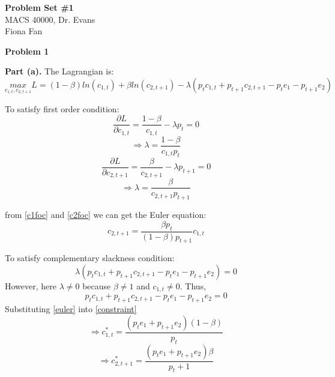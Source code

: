 \documentclass[letterpaper,12pt]{article}
\theoremstyle{definition}
\begin{document}
\begin{flushleft}
  \textbf{\large{Problem Set \#1}} \\
  MACS 40000, Dr. Evans \\
  Fiona Fan 
\end{flushleft}

\vspace{5mm}

\noindent\textbf{Problem 1}

\textbf{Part (a).} The Lagrangian is:
\begin{equation*}
	\underset{c_{1,t}, c_{2,t+1}}{max}
  L= (1-\beta)ln(c_{1,t})+\beta ln(c_{2,t+1})-\lambda (p_t c_{1,t}+p_{t+1} c_{2,t+1}-p_t e_1-p_{t+1} e_2)
\end{equation*}

To satisfy first order condition:
\begin{equation*} 
\frac{\partial L}{\partial c_{1,t}} = \frac{1-\beta}{c_{1,t}}-\lambda p_t = 0
\end{equation*}
\begin{equation} \label{c1foc}
\Rightarrow \lambda = \frac{1-\beta}{c_{1,t}  p_t}
\end{equation}
\begin{equation*} 
\frac{\partial L}{\partial c_{2,t+1}} = \frac{\beta}{c_{2,t+1}}-\lambda p_{t+1} = 0
\end{equation*}
\begin{equation} \label{c2foc}
\Rightarrow \lambda = \frac{\beta}{c_{2,t+1} p_{t+1}}
\end{equation}

from \eqref{c1foc} and \eqref{c2foc} we can get the Euler equation:
\begin{equation} \label{euler}
c_{2,t+1}=\frac{\beta p_t}{(1-\beta) p_{t+1}} c_{1,t}
\end{equation}

To satisfy complementary slackness condition:
\begin{equation*}
\lambda (p_t c_{1,t}+p_{t+1} c_{2,t+1}-p_t e_1-p_{t+1} e_2) = 0
\end {equation*}
However, here $\lambda \neq 0$ because $\beta \neq 1$ and $c_{1,t} \neq 0$. Thus,
\begin{equation} \label{constraint}
p_t c_{1,t}+p_{t+1} c_{2,t+1}-p_t e_1-p_{t+1} e_2 = 0
\end {equation}
Substituting \eqref{euler} into \eqref{constraint}
\begin{equation} \label{c1a}
\Rightarrow c_{1,t}^*=\frac{(p_t e_1+p_{t+1} e_2)(1-\beta)}{p_t}
\end {equation}
\begin{equation} \label{c2a}
\Rightarrow c_{2,t+1}^*=\frac{(p_t e_1+p_{t+1} e_2) \beta}{p_t+1}
\end {equation}
\end{document}
